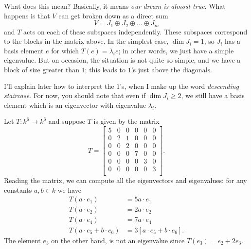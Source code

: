 What does this mean?
Basically, it means \emph{our dream is almost true}.
What happens is that $V$ can get broken down as a direct sum
\[ V = J_1 \oplus J_2 \oplus \dots \oplus J_m \]
and $T$ acts on each of these subspaces independently.
These subspaces correspond to the blocks in the matrix above.
In the simplest case, $\dim J_i = 1$,
so $J_i$ has a basis element $e$
for which $T(e) = \lambda_i e$;
in other words, we just have a simple eigenvalue.
But on occasion, the situation is not quite so simple,
and we have a block of size greater than $1$;
this leads to $1$'s just above the diagonals.

I'll explain later how to interpret the $1$'s,
when I make up the word \emph{descending staircase}.
For now, you should note that even if $\dim J_i \ge 2$,
we still have a basis element
which is an eigenvector with eigenvalue $\lambda_i$.

\begin{example}
	Let $T : k^6 \to k^6$ and suppose $T$ is given by the matrix
	\[
		T = \begin{bmatrix}
			5 & 0 & 0 & 0 & 0 & 0 \\
			0 & 2 & 1 & 0 & 0 & 0 \\
			0 & 0 & 2 & 0 & 0 & 0 \\
			0 & 0 & 0 & 7 & 0 & 0 \\
			0 & 0 & 0 & 0 & 3 & 0 \\
			0 & 0 & 0 & 0 & 0 & 3 \\
		\end{bmatrix}.
	\]
	Reading the matrix, we can compute all the eigenvectors and eigenvalues:
	for any constants $a, b \in k$ we have
	\begin{align*}
		T(a \cdot e_1) &= 5a \cdot e_1 \\
		T(a \cdot e_2) &= 2a \cdot e_2 \\
		T(a \cdot e_4) &= 7a \cdot e_4 \\
		T(a \cdot e_5 + b \cdot e_6) &= 3\left[ a \cdot e_5 + b \cdot e_6 \right].
	\end{align*}
	The element $e_3$ on the other hand,
	is not an eigenvalue since $T(e_3) = e_2 + 2e_3$.
\end{example}

%

